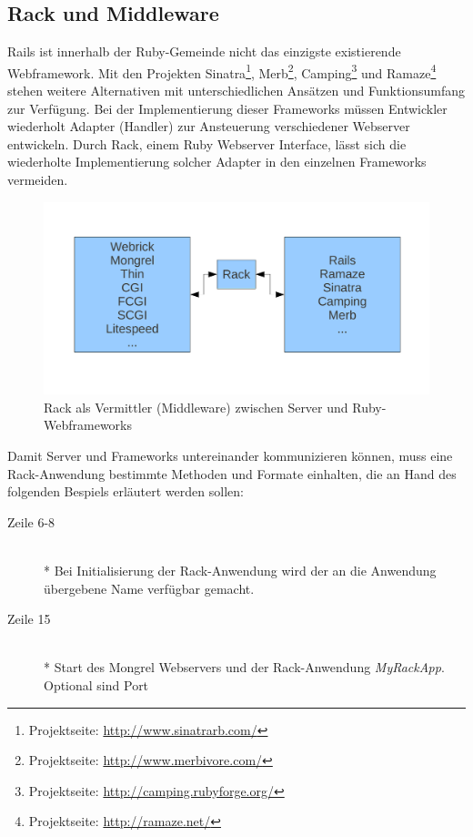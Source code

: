 \subsection{Rack und Middleware}
Rails ist innerhalb der Ruby-Gemeinde nicht das einzigste existierende Webframework. Mit den Projekten Sinatra\footnote{Projektseite: \href{http://www.sinatrarb.com/}{http://www.sinatrarb.com/}}, Merb\footnote{Projektseite: \href{http://www.merbivore.com/}{http://www.merbivore.com/}}, Camping\footnote{Projektseite: \href{http://camping.rubyforge.org/}{http://camping.rubyforge.org/}} und Ramaze\footnote{Projektseite: \href{http://ramaze.net/}{http://ramaze.net/}} stehen weitere Alternativen mit unterschiedlichen Ansätzen und Funktionsumfang zur Verfügung. 
Bei der Implementierung dieser Frameworks müssen Entwickler wiederholt Adapter (Handler) zur Ansteuerung verschiedener Webserver entwickeln. Durch Rack, einem Ruby Webserver Interface, lässt sich die wiederholte Implementierung solcher Adapter in den einzelnen Frameworks vermeiden.

\begin{figure}[!h]
\begin{center}
\includegraphics[scale=0.6]{images/rack/rack.pdf}
\caption{Rack als Vermittler (Middleware) zwischen Server und Ruby-Webframeworks}
\label{rack}
\end{center}
\end{figure}


Damit Server und Frameworks untereinander kommunizieren können, muss eine Rack-Anwendung bestimmte Methoden und Formate einhalten, die an Hand des folgenden Bespiels erläutert werden sollen:



\begin{description}
\item[Zeile 6-8]\mbox{~}\\*
Bei Initialisierung der Rack-Anwendung wird der an die Anwendung übergebene Name verfügbar gemacht.
\item[Zeile 15]\mbox{~}\\*
Start des Mongrel Webservers und der Rack-Anwendung \emph{MyRackApp}. Optional sind Port
\end{description}


